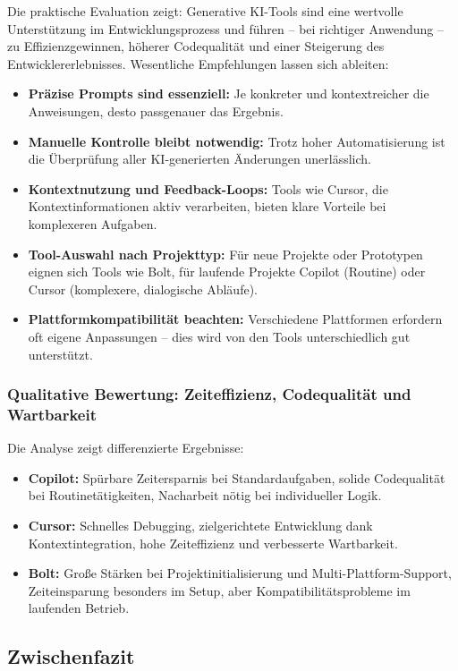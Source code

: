 Die praktische Evaluation zeigt: Generative KI-Tools sind eine wertvolle
Unterstützung im Entwicklungsprozess und führen – bei richtiger Anwendung – zu
Effizienzgewinnen, höherer Codequalität und einer Steigerung des
Entwicklererlebnisses. Wesentliche Empfehlungen lassen sich ableiten:

\begin{itemize}
      \item \textbf{Präzise Prompts sind essenziell:} Je konkreter und kontextreicher die Anweisungen, desto passgenauer das Ergebnis.
      \item \textbf{Manuelle Kontrolle bleibt notwendig:} Trotz hoher Automatisierung ist die Überprüfung aller KI-generierten Änderungen unerlässlich.
      \item \textbf{Kontextnutzung und Feedback-Loops:} Tools wie Cursor, die Kontextinformationen aktiv verarbeiten, bieten klare Vorteile bei komplexeren Aufgaben.
      \item \textbf{Tool-Auswahl nach Projekttyp:} Für neue Projekte oder Prototypen eignen sich Tools wie Bolt, für laufende Projekte Copilot (Routine) oder Cursor (komplexere, dialogische Abläufe).
      \item \textbf{Plattformkompatibilität beachten:} Verschiedene Plattformen erfordern oft eigene Anpassungen – dies wird von den Tools unterschiedlich gut unterstützt.
\end{itemize}

\subsubsection{Qualitative Bewertung: Zeiteffizienz, Codequalität und Wartbarkeit}

Die Analyse zeigt differenzierte Ergebnisse:
\begin{itemize}
      \item \textbf{Copilot:} Spürbare Zeitersparnis bei Standardaufgaben, solide Codequalität bei Routinetätigkeiten, Nacharbeit nötig bei individueller Logik.
      \item \textbf{Cursor:} Schnelles Debugging, zielgerichtete Entwicklung dank Kontextintegration, hohe Zeiteffizienz und verbesserte Wartbarkeit.
      \item \textbf{Bolt:} Große Stärken bei Projektinitialisierung und Multi-Plattform-Support, Zeiteinsparung besonders im Setup, aber Kompatibilitätsprobleme im laufenden Betrieb.
\end{itemize}

\subsection{Zwischenfazit}

